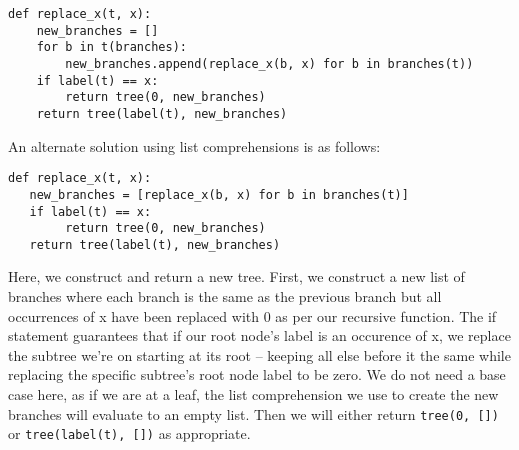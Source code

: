 \begin{blocksection}
\begin{solution}
\begin{lstlisting}
def replace_x(t, x):
    new_branches = []
    for b in t(branches):
        new_branches.append(replace_x(b, x) for b in branches(t))
    if label(t) == x:
        return tree(0, new_branches)
    return tree(label(t), new_branches)
\end{lstlisting}

An alternate solution using list comprehensions is as follows:

\begin{lstlisting}
def replace_x(t, x):
   new_branches = [replace_x(b, x) for b in branches(t)]
   if label(t) == x:
        return tree(0, new_branches)
   return tree(label(t), new_branches)
\end{lstlisting}

Here, we construct and return a new tree. First, we construct a new list of branches where each branch is the same
as the previous branch but all occurrences of x have been replaced with 0 as per our recursive function. 
The if statement guarantees that if our root node's label is an occurence of x, we replace the subtree we're on starting at its root --  
keeping all else before it the same while replacing the specific subtree's root node label to be zero.
\newline
We do not need a base case here, as if we are at a leaf, the list
comprehension we use to create the new branches will evaluate to an 
empty list. Then we will either return \lstinline$tree(0, [])$ or
\lstinline$tree(label(t), [])$ as appropriate. 
\end{solution}
\end{blocksection}


